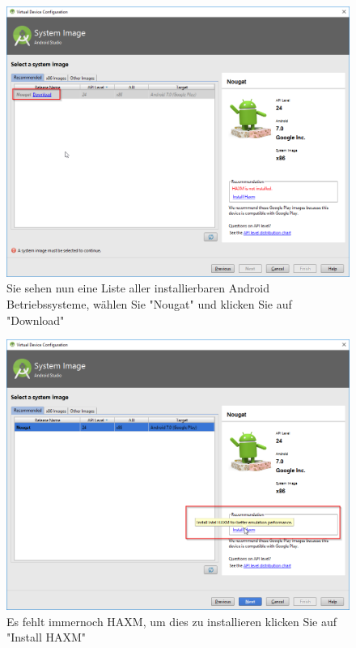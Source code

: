 \documentclass[a4paper,10pt,xetex]{article}
\begin{document}
\begin{figure}
  \centering
  \includegraphics[width=\textwidth]{Installation/3-2}
  \caption{Sie sehen nun eine Liste aller installierbaren Android Betriebssysteme, wählen Sie "Nougat" und klicken Sie auf "Download"}
\end{figure}

\begin{figure}
  \centering
  \includegraphics[width=\textwidth]{Installation/3-3}
  \caption{Es fehlt immernoch HAXM, um dies zu installieren klicken Sie auf "Install HAXM" }
\end{figure}
\end{document}
